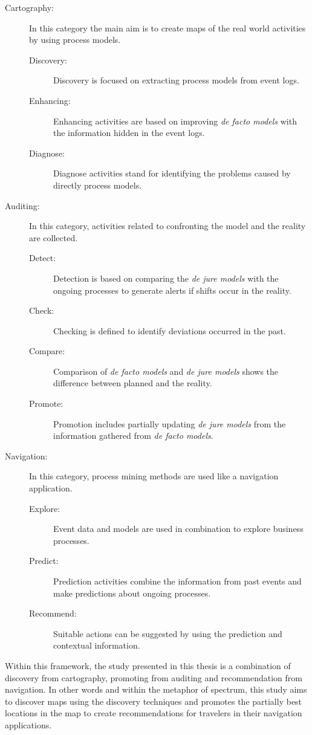 \begin{description}
\item[Cartography:] In this category the main aim is to create maps of the real world activities by using process models. 
	\begin{description}
	\item[Discovery:] Discovery is focused on extracting process models from event logs. 
	\item[Enhancing:] Enhancing activities are based on improving \textit{de facto models} with the information hidden in the event logs. 
	\item[Diagnose:] Diagnose activities stand for identifying the problems caused by directly process models.
	\end{description}
\item[Auditing:] In this category, activities related to confronting the model and the reality are collected.
	\begin{description}
	\item[Detect:] Detection is based on comparing the \textit{de jure models} with the ongoing processes to generate alerts if shifts occur in the reality.
	\item[Check:] Checking is defined to identify deviations occurred in the past.
	\item[Compare:] Comparison of \textit{de facto models} and \textit{de jure models} shows the difference between planned and the reality.
	\item[Promote:] Promotion includes  partially updating \textit{de jure models} from the information gathered from \textit{de facto models}.
	\end{description}
\item[Navigation:] In this category, process mining methods are used like a navigation application.
	\begin{description}
	\item[Explore:] Event data and models are used in combination to explore business processes.
	\item[Predict:] Prediction activities combine the information from past events and make predictions about ongoing processes.
	\item[Recommend:] Suitable actions can be suggested by using the prediction and contextual  information.
	\end{description}
\end{description}

Within this framework, the study presented in this thesis is a combination of discovery from cartography, promoting from auditing and recommendation from navigation. In other words and within the metaphor of spectrum, this study aims to discover maps using the discovery techniques and promotes the partially best locations in the map to create recommendations for travelers in their navigation applications. 

